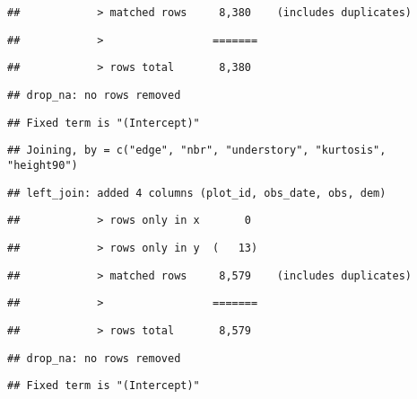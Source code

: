 \documentclass[
]{article}
\begin{document}
\begin{verbatim}
##            > matched rows     8,380    (includes duplicates)
\end{verbatim}

\begin{verbatim}
##            >                 =======
\end{verbatim}

\begin{verbatim}
##            > rows total       8,380
\end{verbatim}

\begin{verbatim}
## drop_na: no rows removed
\end{verbatim}

\begin{verbatim}
## Fixed term is "(Intercept)"
\end{verbatim}

\begin{verbatim}
## Joining, by = c("edge", "nbr", "understory", "kurtosis", "height90")
\end{verbatim}

\begin{verbatim}
## left_join: added 4 columns (plot_id, obs_date, obs, dem)
\end{verbatim}

\begin{verbatim}
##            > rows only in x       0
\end{verbatim}

\begin{verbatim}
##            > rows only in y  (   13)
\end{verbatim}

\begin{verbatim}
##            > matched rows     8,579    (includes duplicates)
\end{verbatim}

\begin{verbatim}
##            >                 =======
\end{verbatim}

\begin{verbatim}
##            > rows total       8,579
\end{verbatim}

\begin{verbatim}
## drop_na: no rows removed
\end{verbatim}

\begin{verbatim}
## Fixed term is "(Intercept)"
\end{verbatim}
\end{document}
